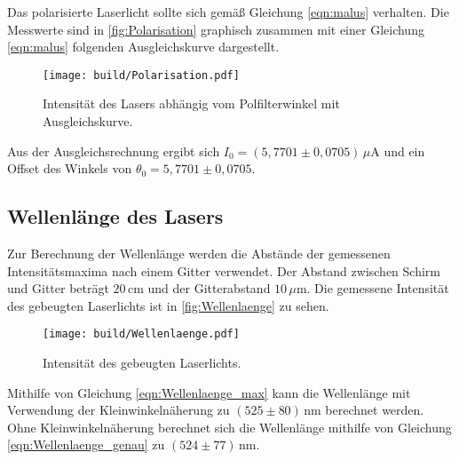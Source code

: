 Das polarisierte Laserlicht sollte sich gemäß Gleichung \ref{eqn:malus} verhalten. Die Messwerte sind in \autoref{fig:Polarisation} graphisch zusammen mit einer Gleichung \ref{eqn:malus} folgenden Ausgleichskurve dargestellt. 

\begin{figure}[h]
    \centering
    \texttt{[image: build/Polarisation.pdf]}
    \caption{Intensität des Lasers abhängig vom Polfilterwinkel mit Ausgleichskurve.}
    \label{fig:Polarisation}
\end{figure}
Aus der Ausgleichsrechnung ergibt sich $I_0 = (5{,}7701 \pm 0{,}0705) \, \unit{\mu\ampere}$ und ein Offset des Winkels von $\theta_0 = 5{,}7701 \pm 0{,}0705$.
\FloatBarrier 

\subsection{Wellenlänge des Lasers}
Zur Berechnung der Wellenlänge werden die Abstände der gemessenen Intensitätsmaxima nach einem Gitter verwendet. Der Abstand zwischen Schirm und Gitter beträgt $20 \, \unit{\centi\meter}$ und der Gitterabstand $10 \, \unit{\mu\meter}$. Die gemessene Intensität des gebeugten Laserlichts ist in \autoref{fig:Wellenlaenge} zu sehen. 
\begin{figure}[h]
    \centering
    \texttt{[image: build/Wellenlaenge.pdf]}
    \caption{Intensität des gebeugten Laserlichts.}
    \label{fig:Wellenlaenge}
\end{figure}
Mithilfe von Gleichung \ref{eqn:Wellenlaenge_max} kann die Wellenlänge mit Verwendung der Kleinwinkelnäherung zu $(525 \pm 80) \, \unit{\nano\meter}$ berechnet werden. Ohne Kleinwinkelnäherung berechnet sich die Wellenlänge mithilfe von Gleichung \ref{eqn:Wellenlaenge_genau} zu $(524 \pm 77) \, \unit{\nano\meter}$. 





